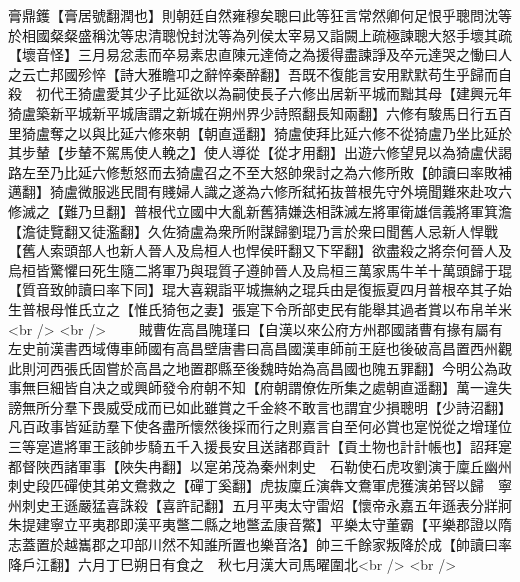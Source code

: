 膏鼎鑊【膏居號翻潤也】則朝廷自然雍穆矣聰曰此等狂言常然卿何足恨乎聰問沈等於相國粲粲盛稱沈等忠清聰悅封沈等為列侯太宰易又詣闕上疏極諫聰大怒手壞其疏【壞音怪】三月易忿恚而卒易素忠直陳元達倚之為援得盡諫諍及卒元達哭之慟曰人之云亡邦國殄悴【詩大雅瞻卭之辭悴秦醉翻】吾既不復能言安用默默苟生乎歸而自殺　初代王猗盧愛其少子比延欲以為嗣使長子六修出居新平城而黜其母【建興元年猗盧築新平城新平城唐謂之新城在朔州界少詩照翻長知兩翻】六修有駿馬日行五百里猗盧奪之以與比延六修來朝【朝直遥翻】猗盧使拜比延六修不從猗盧乃坐比延於其步輦【步輦不駕馬使人輓之】使人導從【從才用翻】出遊六修望見以為猗盧伏謁路左至乃比延六修慙怒而去猗盧召之不至大怒帥衆討之為六修所敗【帥讀曰率敗補邁翻】猗盧微服逃民間有賤婦人識之遂為六修所弑拓抜普根先守外境聞難來赴攻六修滅之【難乃旦翻】普根代立國中大亂新舊猜嫌迭相誅滅左將軍衛雄信義將軍箕澹【澹徒覽翻又徒濫翻】久佐猗盧為衆所附謀歸劉琨乃言於衆曰聞舊人忌新人悍戰【舊人索頭部人也新人晉人及烏桓人也悍侯旰翻又下罕翻】欲盡殺之將奈何晉人及烏桓皆驚懼曰死生隨二將軍乃與琨質子遵帥晉人及烏桓三萬家馬牛羊十萬頭歸于琨【質音致帥讀曰率下同】琨大喜親詣平城撫納之琨兵由是復振夏四月普根卒其子始生普根母惟氏立之【惟氏猗㐌之妻】張寔下令所部吏民有能舉其過者賞以布帛羊米<br />
<br />
　　賊曹佐高昌隗瑾曰【自漢以來公府方州郡國諸曹有掾有屬有左史前漢書西域傳車師國有高昌壁唐書曰高昌國漢車師前王庭也後破高昌置西州觀此則河西張氏固嘗於高昌之地置郡縣至後魏時始為高昌國也隗五罪翻】今明公為政事無巨細皆自决之或興師發令府朝不知【府朝謂僚佐所集之處朝直遥翻】萬一違失謗無所分羣下畏威受成而已如此雖賞之千金終不敢言也謂宜少損聰明【少詩沼翻】凡百政事皆延訪羣下使各盡所懷然後採而行之則嘉言自至何必賞也寔悦從之增瑾位三等寔遣將軍王該帥步騎五千入援長安且送諸郡貢計【貢土物也計計帳也】詔拜寔都督陜西諸軍事【陜失冉翻】以寔弟茂為秦州刺史　石勒使石虎攻劉演于廩丘幽州刺史段匹磾使其弟文鴦救之【磾丁奚翻】虎抜廩丘演犇文鴦軍虎獲演弟唘以歸　寧州刺史王遜嚴猛喜誅殺【喜許記翻】五月平夷太守雷炤【懷帝永嘉五年遜表分牂牁朱提建寧立平夷郡即漢平夷鄨二縣之地鄨孟康音鱉】平樂太守董霸【平樂郡證以隋志蓋置於越巂郡之卭部川然不知誰所置也樂音洛】帥三千餘家叛降於成【帥讀曰率降戶江翻】六月丁巳朔日有食之　秋七月漢大司馬曜圍北<br />
<br />
